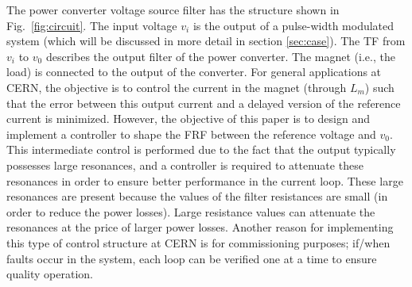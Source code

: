\documentclass[a4paper, 10pt, conference]{ieeeconf}
\begin{document}
The power converter voltage source filter has the structure shown in Fig.~\ref{fig:circuit}. The input voltage $v_i$ is the output of a pulse-width modulated system (which will be discussed in more detail in section \ref{sec:case}). The TF from $v_i$ to $v_0$ describes the output filter of the power converter. The magnet (i.e., the load) is connected to the output of the converter. For general applications at CERN, the objective is to control the current in the magnet (through $L_m$) such that the error between this output current and a delayed version of the reference current is minimized. However, the objective of this paper is to design and implement a controller to shape the FRF between the reference voltage and $v_0$. This intermediate control is performed due to the fact that the output typically possesses large resonances, and a controller is required to attenuate these resonances in order to ensure better performance in the current loop. These large resonances are present because the values of the filter resistances are small (in order to reduce the power losses). Large resistance values can attenuate the resonances at the price of larger power losses. Another reason for implementing this type of control structure at CERN is for commissioning purposes; if/when faults occur in the system, each loop can be verified one at a time to ensure quality operation.
\end{document}
